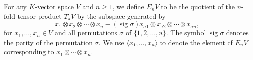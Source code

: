 For any $K$-vector space $V$ and $n \geq 1$, we define $E_n V$ to be the quotient of the $n$-fold tensor product $T_n V$ by the subspace generated by
$$x_1 \otimes x_2 \otimes \cdots \otimes x_n - (\operatorname{sig} \sigma) x_{\sigma 1} \otimes x_{\sigma 2} \otimes \cdots \otimes x_{\sigma n},$$
for $x_1, \ldots, x_n \in V$ and all permutations $\sigma$ of $\{1, 2, \ldots, n\}$. The symbol $\operatorname{sig} \sigma$ denotes the parity of the permutation $\sigma$. We use $\langle x_1, \ldots, x_n \rangle$ to denote the element of $E_n V$ corresponding to $x_1 \otimes \cdots \otimes x_n$.
